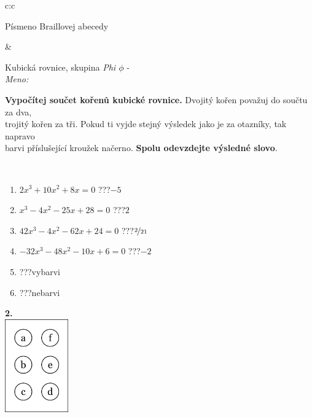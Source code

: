\documentclass[10pt]{report}
\begin{document}
\begin{tabular}{c:c}
\begin{minipage}[c][104.5mm][t]{0.5\linewidth}
\begin{center}
\begin{minipage}{0.20\linewidth}
\begin{center}
{\small Písmeno Braillovej abecedy}
\end{center}
\end{minipage}
\end{center}
\end{minipage}
&
\begin{minipage}[c][104.5mm][t]{0.5\linewidth}
\begin{center}
\vspace{7mm}
{\huge Kubická rovnice, skupina \textit{Phi $\phi$} -}\\[5mm]
\textit{Meno:}\phantom{xxxxxxxxxxxxxxxxxxxxxxxxxxxxxxxxxxxxxxxxxxxxxxxxxxxxxxxxxxxxxxxxx}\\[5mm]
\begin{minipage}{0.95\linewidth}
\textbf{Vypočítej součet kořenů kubické rovnice.} Dvojitý kořen považuj do součtu za dva,\\trojitý kořen za tři. Pokud ti vyjde stejný výsledek jako je za otazníky, tak napravo\\barvi příslušející kroužek načerno. \textbf{Spolu odevzdejte výsledné slovo}.
\end{minipage}
\\[1mm]
\begin{minipage}{0.79\linewidth}
\begin{center}
\begin{varwidth}{\linewidth}
\begin{enumerate}
\Large
\item $2x^3+10x^2+8x=0$\quad \dotfill\; ???\;\dotfill \quad $-5$
\item $x^3-4x^2-25x+28=0$\quad \dotfill\; ???\;\dotfill \quad $2$
\item $42x^3-4x^2-62x+24=0$\quad \dotfill\; ???\;\dotfill \quad $\nicefrac{2}{21}$
\item $-32x^3-48x^2-10x+6=0$\quad \dotfill\; ???\;\dotfill \quad $-2$
\item \quad \dotfill\; ???\;\dotfill \quad vybarvi
\item \quad \dotfill\; ???\;\dotfill \quad nebarvi
\end{enumerate}
\end{varwidth}
\end{center}
\end{minipage}
\begin{minipage}{0.20\linewidth}
\begin{center}
{\Huge\bfseries 2.} \\[2mm]
\includegraphics[height=40mm]{../images/braille.png}

\end{center}
\end{minipage}
\end{center}
\end{minipage}
\end{tabular}
\end{document}
